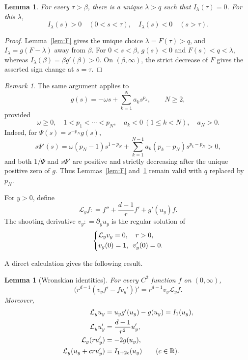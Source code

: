 \documentclass[12pt, a4paper, reqno]{amsart}
\numberwithin{equation}{section}
\newtheorem{lemma}[theorem]{Lemma}
\theoremstyle{definition}
\theoremstyle{remark}
\newtheorem{remark}[theorem]{Remark}
\newcommand{\R}{\mathbb R}
\newcommand{\pt}{\partial}
\newcommand{\ce}{\mathrel{\mathop:}=}
\begin{document}
\begin{lemma}\label{lem:Isign}
For every $\tau>\beta$, there is a unique $\lambda>q$ such that
$I_\lambda(\tau)=0$. For this $\lambda$,
\begin{equation}
\label{eq:Isign}
  I_\lambda(s)>0\quad(0<s<\tau),
  \quad
  I_\lambda(s)<0\quad(s>\tau).
\end{equation}
\end{lemma}

\begin{proof}
Lemma~\ref{lem:F} gives the unique choice $\lambda=F(\tau)>q$, and
$I_\lambda=g(F-\lambda)$ away from $\beta$. For $0<s<\beta$,
$g(s)<0$ and $F(s)<q<\lambda$, whereas
$I_\lambda(\beta)=\beta g'(\beta)>0$. On $(\beta,\infty)$, the strict
decrease of $F$ gives the asserted sign change at $s=\tau$.
\end{proof}
\begin{remark}
\label{multi-pw}
The same argument applies to
\[
  g(s)=-\omega s+\sum_{k=1}^N a_ks^{p_k},
  \qquad N\ge2,
\]
provided
\[
  \omega\ge0,
  \quad
  1<p_1<\cdots<p_N,
  \quad
  a_k<0~(1\le k<N),
  \quad
  a_N>0.
\]
Indeed, for $\Psi(s)=s^{-p_N}g(s)$,
\[
  s\Psi'(s)
  =\omega(p_N-1)s^{1-p_N}
   +\sum_{k=1}^{N-1}a_k(p_k-p_N)s^{p_k-p_N}>0,
\]
and both $1/\Psi$ and $s\Psi'$ are positive and strictly decreasing
after the unique positive zero of $g$. Thus Lemmas~\ref{lem:F} and~\ref{lem:Isign} remain valid with $q$ replaced by $p_N$. 
\end{remark}


For $y>0$, define
\[
  \mathcal L_y f
  \ce f''+\frac{d-1}{r}f'+g'(u_y)f.
\]
The shooting derivative $v_y\ce \pt_yu_y$ is the regular solution of
\begin{equation*}
\begin{dcases}
  \mathcal L_y v_y=0, \quad r>0,\\
  v_y(0)=1,\enspace v_y'(0)=0.
\end{dcases}
\end{equation*}

A direct calculation gives the following result.
\begin{lemma}[Wronskian identities]\label{lem:W}
For every $C^2$ function $f$ on $(0,\infty)$,
\begin{equation}\label{eq:W}
  \bigl(r^{d-1}(v_yf'-fv_y')\bigr)'
  =r^{d-1}v_y\mathcal L_y f.
\end{equation}
Moreover,
\begin{align}
  \mathcal L_y u_y&=u_yg'(u_y)-g(u_y)=I_1(u_y),
    \notag\\
  \mathcal L_y u_y'&=\frac{d-1}{r^2}u_y',
    \label{eq:Luprime}\\
  \mathcal L_y(ru_y')&=-2g(u_y),
    \notag\\
  \mathcal L_y(u_y+cru_y')&=I_{1+2c}(u_y)
  \qquad(c\in\R).
    \label{eq:Lf}
\end{align}
\end{lemma}
\end{document}
